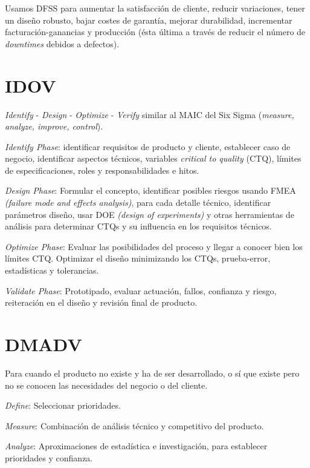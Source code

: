 \documentclass[oneside]{book}
\begin{document}
Usamos DFSS para aumentar la satisfacción de cliente, reducir variaciones, tener un diseño robusto, bajar costes de garantía, mejorar durabilidad, incrementar facturación-ganancias y producción (ésta última a través de reducir el número de \textit{downtimes} debidos a defectos).

\section{IDOV} \textit{Identify} - \textit{Design} - \textit{Optimize} - \textit{Verify} similar al MAIC del Six Sigma (\textit{measure, analyze, improve, control}).

\textit{Identify Phase}: identificar requisitos de producto y cliente, establecer caso de negocio, identificar aspectos técnicos, variables \textit{critical to quality} (CTQ), límites de especificaciones, roles y responsabilidades e hitos.

\textit{Design Phase}: Formular el concepto, identificar posibles riesgos usando FMEA \textit{(failure mode and effects analysis)}, para cada detalle técnico, identificar parámetros diseño, usar DOE \textit{(design of experiments)} y otras herramientas de análisis para determinar CTQs y su influencia en los requisitos técnicos.

\textit{Optimize Phase}: Evaluar las posibilidades del proceso y llegar a conocer bien los límites CTQ. Optimizar el diseño minimizando los CTQs, prueba-error, estadísticas y tolerancias.

\textit{Validate Phase}: Prototipado, evaluar actuación, fallos, confianza y riesgo, reiteración en el diseño y revisión final de producto.

\section{DMADV} Para cuando el producto no existe y ha de ser desarrollado, o sí que existe pero no se conocen las necesidades del negocio o del cliente. 

\textit{Define}: Seleccionar prioridades.

\textit{Measure}: Combinación de análisis técnico y competitivo del producto. 

\textit{Analyze}: Aproximaciones de estadística e investigación, para establecer prioridades y confianza.
\end{document}
